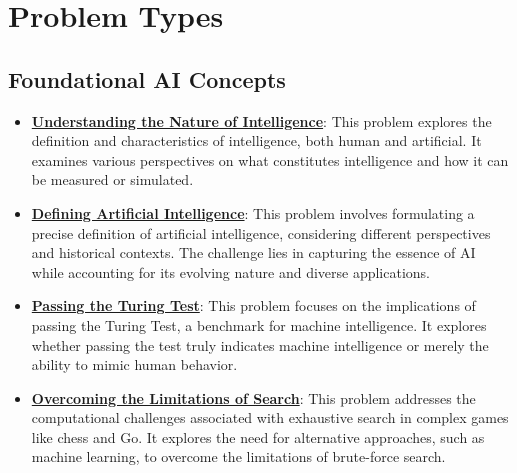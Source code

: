 \documentclass{article}%
\begin{document}
%
\section{Problem Types}%
\label{sec:ProblemTypes}%
\subsection{Foundational AI Concepts}%
\label{subsec:FoundationalAIConcepts}%
\begin{itemize}[leftmargin=*]%
\item \href{https://purdue.brightspace.com/d2l/common/assets/pdfjs-d2l-dist/1.0.14-legacy/web/viewer.html?file=\%2Fcontent\%2Fenforced\%2F1095467-wl.202510.CS.24300.001\%2F02L2-Intro.pdf\%3Fou\%3D1095467\&lang=en-us\&container=d2l-fileviewer-rendered-pdf\&fullscreen=d2l-fileviewer-rendered-pdf-dialog\&height=667#page=5}{\textbf{Understanding the Nature of Intelligence}}: This problem explores the definition and characteristics of intelligence, both human and artificial. It examines various perspectives on what constitutes intelligence and how it can be measured or simulated.%
\item \href{https://purdue.brightspace.com/d2l/common/assets/pdfjs-d2l-dist/1.0.14-legacy/web/viewer.html?file=\%2Fcontent\%2Fenforced\%2F1095467-wl.202510.CS.24300.001\%2F02L2-Intro.pdf\%3Fou\%3D1095467\&lang=en-us\&container=d2l-fileviewer-rendered-pdf\&fullscreen=d2l-fileviewer-rendered-pdf-dialog\&height=667#page=5}{\textbf{Defining Artificial Intelligence}}: This problem involves formulating a precise definition of artificial intelligence, considering different perspectives and historical contexts. The challenge lies in capturing the essence of AI while accounting for its evolving nature and diverse applications.%
\item \href{https://purdue.brightspace.com/d2l/common/assets/pdfjs-d2l-dist/1.0.14-legacy/web/viewer.html?file=\%2Fcontent\%2Fenforced\%2F1095467-wl.202510.CS.24300.001\%2F02L2-Intro.pdf\%3Fou\%3D1095467\&lang=en-us\&container=d2l-fileviewer-rendered-pdf\&fullscreen=d2l-fileviewer-rendered-pdf-dialog\&height=667#page=6}{\textbf{Passing the Turing Test}}: This problem focuses on the implications of passing the Turing Test, a benchmark for machine intelligence. It explores whether passing the test truly indicates machine intelligence or merely the ability to mimic human behavior.%
\item \href{https://purdue.brightspace.com/d2l/common/assets/pdfjs-d2l-dist/1.0.14-legacy/web/viewer.html?file=\%2Fcontent\%2Fenforced\%2F1095467-wl.202510.CS.24300.001\%2F02L2-Intro.pdf\%3Fou\%3D1095467\&lang=en-us\&container=d2l-fileviewer-rendered-pdf\&fullscreen=d2l-fileviewer-rendered-pdf-dialog\&height=667#page=11}{\textbf{Overcoming the Limitations of Search}}: This problem addresses the computational challenges associated with exhaustive search in complex games like chess and Go. It explores the need for alternative approaches, such as machine learning, to overcome the limitations of brute-force search.%

\end{itemize}
\end{document}
